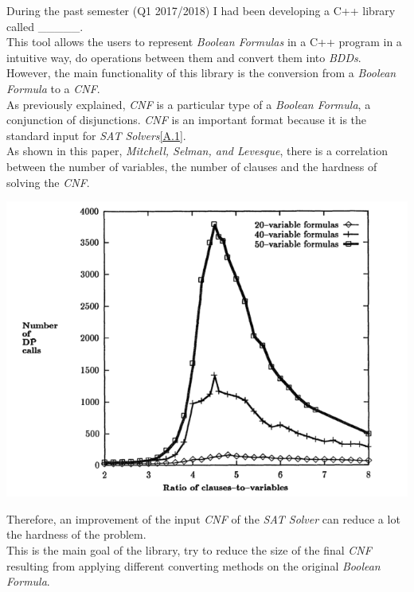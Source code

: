During the past semester (Q1 2017/2018) I had been developing a C++ library called \_\_\_\_\_.\\
This tool allows the users to represent \emph{Boolean Formulas} in a C++ program in a intuitive way, do operations between them and convert them into \emph{BDDs}. However, the main functionality of this library is the conversion from a \emph{Boolean Formula} to a \emph{CNF}.  \\
As previously explained, \emph{CNF} is a particular type of a \emph{Boolean Formula}, a conjunction of disjunctions. \emph{CNF} is an important format because it is the standard input for \emph{SAT Solvers}\ref{A.1}.\\
As shown in this paper, \emph{Mitchell, Selman, and Levesque\cite{Mitchell}}, there is a correlation between the number of variables, the number of clauses and the hardness of solving the \emph{CNF}.
\begin{center}
	\includegraphics[width=1\textwidth]{Figures/GraphMitchellSelmanLevesque.png}
\end{center}
Therefore, an improvement of the input \emph{CNF} of the \emph{SAT Solver} can reduce a lot the hardness of the problem. \\
This is the main goal of the library, try to reduce the size of the final \emph{CNF} resulting from applying different converting methods on the original \emph{Boolean Formula}.

